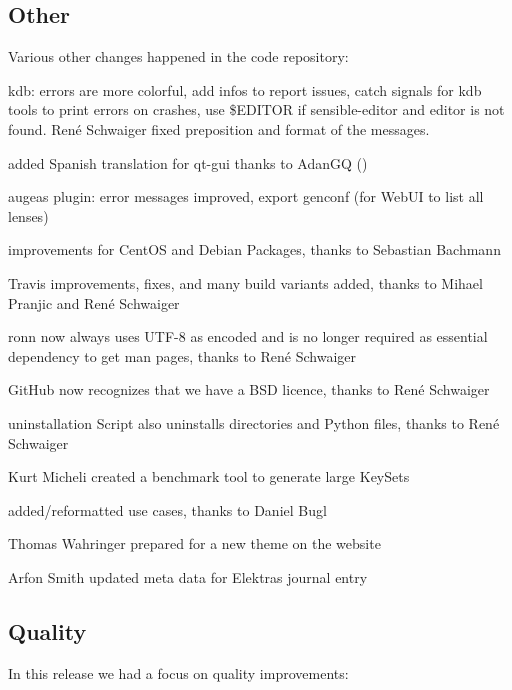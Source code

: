 \subsection*{Other}

Various other changes happened in the code repository\+:


\begin{DoxyItemize}
\item kdb\+: errors are more colorful, add infos to report issues, catch signals for {\ttfamily kdb} tools to print errors on crashes, use {\ttfamily \$\+E\+D\+I\+T\+OR} if {\ttfamily sensible-\/editor} and {\ttfamily editor} is not found. René Schwaiger fixed preposition and format of the messages.
\item added Spanish translation for qt-\/gui thanks to Adan\+GQ ()
\item augeas plugin\+: error messages improved, export genconf (for Web\+UI to list all lenses)
\item improvements for Cent\+OS and Debian Packages, thanks to Sebastian Bachmann
\item Travis improvements, fixes, and many build variants added, thanks to Mihael Pranjic and René Schwaiger
\item {\ttfamily ronn} now always uses U\+T\+F-\/8 as encoded and is no longer required as essential dependency to get man pages, thanks to René Schwaiger
\item Git\+Hub now recognizes that we have a B\+SD licence, thanks to René Schwaiger
\item uninstallation Script also uninstalls directories and Python files, thanks to René Schwaiger
\item Kurt Micheli created a benchmark tool to generate large Key\+Sets
\item added/reformatted use cases, thanks to Daniel Bugl
\item Thomas Wahringer prepared for a new theme on the website
\item Arfon Smith updated meta data for Elektra\textquotesingle{}s journal entry
\end{DoxyItemize}

\subsection*{Quality}

In this release we had a focus on quality improvements\+:


